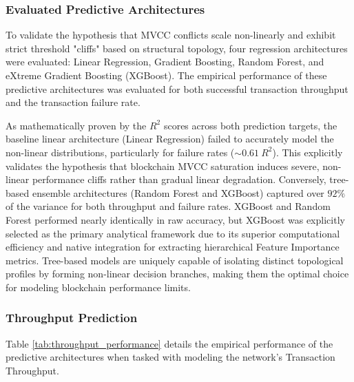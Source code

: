 \documentclass[12pt]{article}
\begin{document}
\subsubsection{Evaluated Predictive Architectures}
To validate the hypothesis that MVCC conflicts scale non-linearly and exhibit strict threshold "cliffs" based on structural topology, four regression architectures were evaluated: Linear Regression, Gradient Boosting, Random Forest, and eXtreme Gradient Boosting (XGBoost). The empirical performance of these predictive architectures was evaluated for both successful transaction throughput and the transaction failure rate. 

As mathematically proven by the $R^2$ scores across both prediction targets, the baseline linear architecture (Linear Regression) failed to accurately model the non-linear distributions, particularly for failure rates ($\sim0.61~R^2$). This explicitly validates the hypothesis that blockchain MVCC saturation induces severe, non-linear performance cliffs rather than gradual linear degradation. Conversely, tree-based ensemble architectures (Random Forest and XGBoost) captured over $92\%$ of the variance for both throughput and failure rates. XGBoost and Random Forest performed nearly identically in raw accuracy, but XGBoost was explicitly selected as the primary analytical framework due to its superior computational efficiency and native integration for extracting hierarchical Feature Importance metrics. Tree-based models are uniquely capable of isolating distinct topological profiles by forming non-linear decision branches, making them the optimal choice for modeling blockchain performance limits.

\subsubsection{Throughput Prediction}
Table \ref{tab:throughput_performance} details the empirical performance of the predictive architectures when tasked with modeling the network's Transaction Throughput.

\begin{table}[ht]
\centering
\caption{Comparative Predictive Performance (Target: Transaction Throughput)}
\label{tab:throughput_performance}
\end{table}
\end{document}
